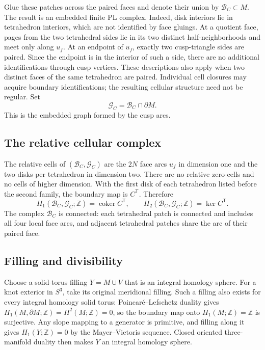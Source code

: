 \documentclass[11pt]{article}
\theoremstyle{definition}\newtheorem{definition}[theorem]{Definition}
\theoremstyle{remark}\newtheorem{remark}[theorem]{Remark}
\DeclareMathOperator{\coker}{coker}
\newcommand{\Z}{\mathbb Z}
\begin{document}
Glue these patches across the paired faces and denote their union by
$\mathcal B_C\subset M$. The result is an embedded finite PL complex.
Indeed, disk interiors lie in tetrahedron interiors, which are not
identified by face gluings. At a quotient face, pages from the two
tetrahedral sides lie in its two distinct half-neighborhoods and meet
only along $u_f$. At an endpoint of $u_f$, exactly two cusp-triangle
sides are paired. Since the endpoint is in the interior of such a side,
there are no additional identifications through cusp vertices.
These descriptions also apply when two distinct faces of the same
tetrahedron are paired. Individual cell closures may acquire boundary
identifications; the resulting cellular structure need not be regular.
Set
\[
 \mathcal G_C=\mathcal B_C\cap\partial M.
\]
This is the embedded graph formed by the cusp arcs.

\subsection{The relative cellular complex}

The relative cells of $(\mathcal B_C,\mathcal G_C)$ are the $2N$ face
arcs $u_f$ in dimension one and the two disks per tetrahedron in
dimension two. There are no relative zero-cells and no cells of higher
dimension. With the first disk of each tetrahedron listed before the
second family, the boundary map is $C^{\mathsf T}$. Therefore
\begin{equation}
 H_1(\mathcal B_C,\mathcal G_C;\Z)=\coker C^{\mathsf T},\qquad
 H_2(\mathcal B_C,\mathcal G_C;\Z)=\ker C^{\mathsf T}.
 \label{eq:relativeface}
\end{equation}
The complex $\mathcal B_C$ is connected: each tetrahedral patch is
connected and includes all four local face arcs, and adjacent
tetrahedral patches share the arc of their paired face.

\subsection{Filling and divisibility}

Choose a solid-torus filling $Y=M\cup V$ that is an integral homology
sphere. For a knot exterior in $S^3$, take its original meridional
filling. Such a filling also exists for every integral homology solid
torus: Poincar\'e--Lefschetz duality gives
$H_1(M,\partial M;\Z)=H^2(M;\Z)=0$, so the boundary map onto
$H_1(M;\Z)=\Z$ is surjective. Any slope mapping to a generator is
primitive, and filling along it gives $H_1(Y;\Z)=0$ by the
Mayer--Vietoris sequence. Closed oriented three-manifold duality then
makes $Y$ an integral homology sphere.
\end{document}
